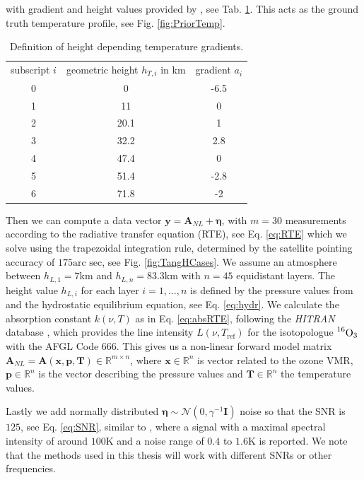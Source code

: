 with gradient and height values provided by \cite{atmosphere1976us}, see Tab. \ref{tab:tempGrad}.
This acts as the ground truth temperature profile, see Fig. \ref{fig:PriorTemp}.
\begin{table}
	\centering
	\begin{tabular}{ |c||c|c|  }
		\hline
		subscript $i$ & geometric height $h_{T,i}$ in km&gradient $a_i$\\
		\hhline{|=||=|=|}
		0& 0 & -6.5\\
		1& 11 & 0\\
		2& 20.1& 1\\
		3& 32.2& 2.8\\
		4& 47.4& 0\\
		5& 51.4& -2.8\\
		6& 71.8& -2\\
		\hline
	\end{tabular}
\caption[Height depending temperature gradients]{Definition of height depending temperature gradients.}
\label{tab:tempGrad}
\end{table}

Then we can compute a data vector $\bm{y} = \bm{A}_{NL} + \bm{\eta} $, with $m = 30$ measurements according to the radiative transfer equation (RTE), see Eq. \ref{eq:RTE} which we solve using the trapezoidal integration rule, determined by the satellite pointing accuracy of $175\text{arc sec}$, see Fig. \ref{fig:TangHCases}.
We assume an atmosphere between $h_{L,1}=7$km and $h_{L,n} = 83.3$km with $n = 45$ equidistant layers.
The height value $h_{L,i}$ for each layer $i = 1,\dots, n$ is defined by the pressure values from \cite{MLSdata} and the hydrostatic equilibrium equation, see Eq. \ref{eq:hydr}.
We calculate the absorption constant $k(\nu,T)$ as in Eq. \ref{eq:absRTE}, following the \textit{HITRAN} database \cite{gordon2022hitran2020}, which provides the line intensity $L(\nu,T_{\text{ref}})$ for the isotopologue $\prescript{16}{}{\text{O}}_3$ with the AFGL Code 666.
This gives us a non-linear forward model matrix $\bm{A}_{NL} = \bm{A}(\bm{x}, \bm{p}, \bm{T}) \in \mathbb{R}^{m \times n}$, where $\bm{x}\in \mathbb{R}^{n}$ is vector related to the ozone VMR, $\bm{p}\in \mathbb{R}^{n}$ is the vector describing the pressure values and $\bm{T}\in \mathbb{R}^{n}$ the temperature values.

Lastly we add normally distributed $\bm{\eta} \sim \mathcal{N}(0,\gamma^{-1} \bm{I})$ noise so that the SNR is $125$, see Eq. \ref{eq:SNR}, similar to \cite{Froidevaux2008snrozone}, where a signal with a maximal spectral intensity of around $100\text{K}$ and a noise range of $0.4$ to $1.6\text{K}$ is reported.
We note that the methods used in this thesis will work with different SNRs or other frequencies.

